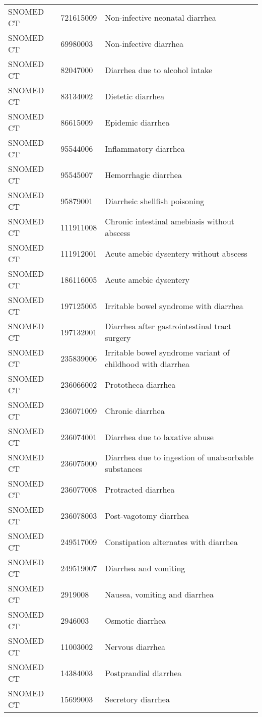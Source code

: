 \begin{longtable}{p{}p{}p{}}
  SNOMED CT & 721615009 & Non-infective neonatal diarrhea \\ 
  SNOMED CT & 69980003 & Non-infective diarrhea \\ 
  SNOMED CT & 82047000 & Diarrhea due to alcohol intake \\ 
  SNOMED CT & 83134002 & Dietetic diarrhea \\ 
  SNOMED CT & 86615009 & Epidemic diarrhea \\ 
  SNOMED CT & 95544006 & Inflammatory diarrhea \\ 
  SNOMED CT & 95545007 & Hemorrhagic diarrhea \\ 
  SNOMED CT & 95879001 & Diarrheic shellfish poisoning \\ 
  SNOMED CT & 111911008 & Chronic intestinal amebiasis without abscess \\ 
  SNOMED CT & 111912001 & Acute amebic dysentery without abscess \\ 
  SNOMED CT & 186116005 & Acute amebic dysentery \\ 
  SNOMED CT & 197125005 & Irritable bowel syndrome with diarrhea \\ 
  SNOMED CT & 197132001 & Diarrhea after gastrointestinal tract surgery \\ 
  SNOMED CT & 235839006 & Irritable bowel syndrome variant of childhood with diarrhea \\ 
  SNOMED CT & 236066002 & Prototheca diarrhea \\ 
  SNOMED CT & 236071009 & Chronic diarrhea \\ 
  SNOMED CT & 236074001 & Diarrhea due to laxative abuse \\ 
  SNOMED CT & 236075000 & Diarrhea due to ingestion of unabsorbable substances \\ 
  SNOMED CT & 236077008 & Protracted diarrhea \\ 
  SNOMED CT & 236078003 & Post-vagotomy diarrhea \\ 
  SNOMED CT & 249517009 & Constipation alternates with diarrhea \\ 
  SNOMED CT & 249519007 & Diarrhea and vomiting \\ 
  SNOMED CT & 2919008 & Nausea, vomiting and diarrhea \\ 
  SNOMED CT & 2946003 & Osmotic diarrhea \\ 
  SNOMED CT & 11003002 & Nervous diarrhea \\ 
  SNOMED CT & 14384003 & Postprandial diarrhea \\ 
  SNOMED CT & 15699003 & Secretory diarrhea \\ 

\end{longtable}
